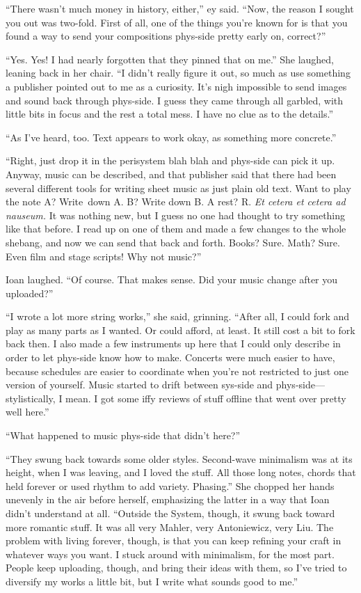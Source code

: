 ``There wasn't much money in history, either,'' ey said. ``Now, the reason I sought you out was two-fold. First of all, one of the things you're known for is that you found a way to send your compositions phys-side pretty early on, correct?''

``Yes. Yes! I had nearly forgotten that they pinned that on me.'' She laughed, leaning back in her chair. ``I didn't really figure it out, so much as use something a publisher pointed out to me as a curiosity. It's nigh impossible to send images and sound back through phys-side. I guess they came through all garbled, with little bits in focus and the rest a total mess. I have no clue as to the details.''

``As I've heard, too. Text appears to work okay, as something more concrete.''

``Right, just drop it in the perisystem blah blah and phys-side can pick it up. Anyway, music can be described, and that publisher said that there had been several different tools for writing sheet music as just plain old text. Want to play the note A? Write\pagebreak\ down A. B? Write down B. A rest? R. \emph{Et cetera et cetera ad nauseum.} It was nothing new, but I guess no one had thought to try something like that before. I read up on one of them and made a few changes to the whole shebang, and now we can send that back and forth. Books? Sure. Math? Sure. Even film and stage scripts! Why not music?''

Ioan laughed. ``Of course. That makes sense. Did your music change after you uploaded?''

``I wrote a lot more string works,'' she said, grinning. ``After all, I could fork and play as many parts as I wanted. Or could afford, at least. It still cost a bit to fork back then. I also made a few instruments up here that I could only describe in order to let phys-side know how to make. Concerts were much easier to have, because schedules are easier to coordinate when you're not restricted to just one version of yourself. Music started to drift between sys-side and phys-side---stylistically, I mean. I got some iffy reviews of stuff offline that went over pretty well here.''

``What happened to music phys-side that didn't here?''

``They swung back towards some older styles. Second-wave minimalism was at its height, when I was leaving, and I loved the stuff. All those long notes, chords that held forever or used rhythm to add variety. Phasing.'' She chopped her hands unevenly in the air before herself, emphasizing the latter in a way that Ioan didn't understand at all. ``Outside the System, though, it swung back toward more romantic stuff. It was all very Mahler, very Antoniewicz, very Liu. The problem with living forever, though, is that you can keep refining your craft in whatever ways you want. I stuck around with minimalism, for the most part. People keep uploading, though, and bring their ideas with them, so I've tried to diversify my works a little bit, but I write what sounds good to me.''

